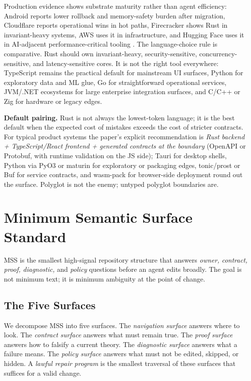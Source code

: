 \documentclass[conference]{IEEEtran}
\newcommand{\mss}{\textnormal{\textsc{MSS}}}
\begin{document}
Production evidence shows substrate maturity rather than agent efficiency: Android reports lower rollback and memory-safety burden after migration, Cloudflare reports operational wins in hot paths, Firecracker shows Rust in invariant-heavy systems, AWS uses it in infrastructure, and Hugging Face uses it in AI-adjacent performance-critical tooling \cite{googleAndroid2025,googleAndroid2022,cloudflareRust2025,firecracker2026,awsRust2022,hfTokenizers2026}. The language-choice rule is comparative. Rust should own invariant-heavy, security-sensitive, concurrency-sensitive, and latency-sensitive cores. It is not the right tool everywhere: TypeScript remains the practical default for mainstream UI surfaces, Python for exploratory data and ML glue, Go for straightforward operational services, JVM/.NET ecosystems for large enterprise integration surfaces, and C/C++ or Zig for hardware or legacy edges.

\noindent\textbf{Default pairing.} Rust is not always the lowest-token language; it is the best default when the expected cost of mistakes exceeds the cost of stricter contracts. For typical product systems the paper's explicit recommendation is \emph{Rust backend + TypeScript/React frontend + generated contracts at the boundary} (OpenAPI or Protobuf, with runtime validation on the JS side); Tauri for desktop shells, Python via PyO3 or maturin for exploratory or packaging edges, tonic/prost or Buf for service contracts, and wasm-pack for browser-side deployment round out the surface. Polyglot is not the enemy; untyped polyglot boundaries are.

\section{Minimum Semantic Surface Standard}
\label{sec:mss}
\mss{} is the smallest high-signal repository structure that answers \emph{owner, contract, proof, diagnostic,} and \emph{policy} questions before an agent edits broadly. The goal is not minimum text; it is minimum ambiguity at the point of change.

\subsection{The Five Surfaces}
We decompose \mss{} into five surfaces. The \emph{navigation surface} answers where to look. The \emph{contract surface} answers what must remain true. The \emph{proof surface} answers how to falsify a current theory. The \emph{diagnostic surface} answers what a failure means. The \emph{policy surface} answers what must not be edited, skipped, or hidden. A \emph{lawful repair program} is the smallest traversal of these surfaces that suffices for a valid change.
\end{document}

